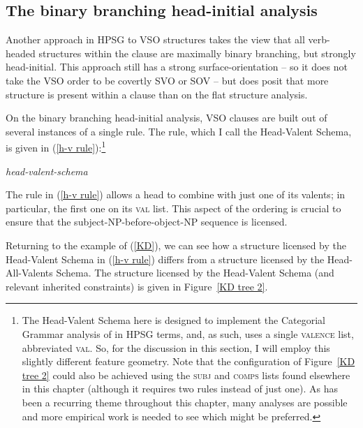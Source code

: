 \documentclass[output=paper
	        ,collection
	        ,collectionchapter
 	        ,biblatex
                ,babelshorthands
                ,newtxmath
                ,draftmode
                ,colorlinks, citecolor=brown
]{langscibook}
\begin{document}
\subsection{The binary branching head-initial analysis} 

Another approach in HPSG to VSO structures takes the view that all verb-headed structures within the clause are maximally binary branching, but strongly head-initial. This approach still has a strong surface-orientation -- so it does not take the VSO order to be covertly SVO or SOV -- but does posit that more structure is present within a clause than on the flat structure analysis. 

On the binary branching head-initial analysis, VSO clauses are built out of several instances of a single rule. The rule, which I call the Head-Valent Schema, is given in (\ref{h-v rule}):\footnote{The Head-Valent Schema here is designed to implement the Categorial Grammar analysis of \citet{keenan2000} in HPSG terms, and, as such, uses a single \textsc{valence} list, abbreviated \textsc{val}. So, for the discussion in this section, I will employ this slightly different feature geometry. Note that the configuration of Figure~\ref{KD tree 2} could also be achieved using the \textsc{subj} and \textsc{comps} lists found elsewhere in this chapter (although it requires two rules instead of just one). As has been a recurring theme throughout this chapter, many analyses are possible and more empirical work is needed to see which might be preferred.} 
%
\begin{exe}
\ex \label{h-v rule}
\emph{head-valent-schema} \impl  \\
\end{exe}
%
The rule in (\ref{h-v rule}) allows a head to combine with just one of its valents; in particular, the first one on its \textsc{val} list. This aspect of the ordering is crucial to ensure that the subject-NP-before-object-NP sequence is licensed.

Returning to the  example of (\ref{KD}), we can see how a structure licensed by the Head-Valent Schema in (\ref{h-v rule}) differs from a structure licensed by the Head-All-Valents Schema. The structure licensed by the Head-Valent Schema (and relevant inherited constraints) is given in Figure~\ref{KD tree 2}.
\end{document}
